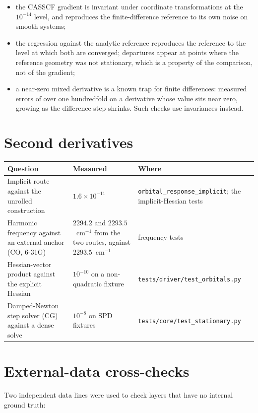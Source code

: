 \begin{itemize}
  \item the CASSCF gradient is invariant under coordinate
    transformations at the $10^{-14}$ level, and reproduces the
    finite-difference reference to its own noise on smooth systems;
  \item the regression against the analytic reference reproduces the
    reference to the level at which both are converged; departures
    appear at points where the reference geometry was not stationary,
    which is a property of the comparison, not of the gradient;
  \item a near-zero mixed derivative is a known trap for finite
    differences: measured errors of over one hundredfold on a
    derivative whose value sits near zero, growing as the difference
    step shrinks.  Such checks use invariances instead.
\end{itemize}

\section{Second derivatives}

\begin{center}
\begin{tabular}{p{}p{}p{}}
\toprule
Question & Measured & Where \\
\midrule
Implicit route against the unrolled construction &
$1.6\times 10^{-11}$ &
\texttt{orbital\_response\_implicit}; the implicit-Hessian tests \\
Harmonic frequency against an external anchor (CO, 6-31G) &
$2294.2$ and $2293.5$~cm$^{-1}$ from the two routes, against
$2293.5$~cm$^{-1}$ &
frequency tests \\
Hessian-vector product against the explicit Hessian &
$10^{-10}$ on a non-quadratic fixture &
\texttt{tests/driver/test\_orbitals.py} \\
Damped-Newton step solver (CG) against a dense solve &
$10^{-8}$ on SPD fixtures &
\texttt{tests/core/test\_stationary.py} \\
\bottomrule
\end{tabular}
\end{center}

\section{External-data cross-checks}

Two independent data lines were used to check layers that have no
internal ground truth:

